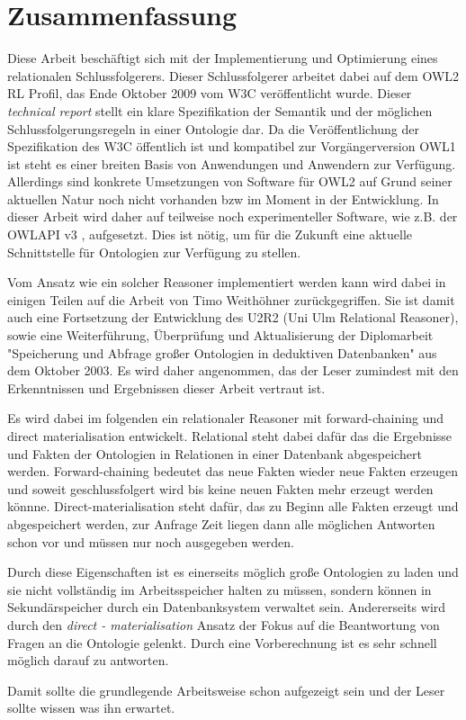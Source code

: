 \section*{Zusammenfassung}
Diese Arbeit beschäftigt sich mit der Implementierung und Optimierung eines relationalen Schlussfolgerers. Dieser Schlussfolgerer arbeitet dabei auf dem OWL2 RL Profil, das Ende Oktober 2009 vom W3C \cite{OWL2Profiles} veröffentlicht wurde. Dieser \emph{technical report} stellt ein klare Spezifikation der Semantik und der möglichen Schlussfolgerungsregeln in einer Ontologie dar. Da die Veröffentlichung der Spezifikation des W3C öffentlich ist und kompatibel zur Vorgängerversion OWL1 \cite{OWL1} ist steht es einer breiten Basis von Anwendungen und Anwendern zur Verfügung. Allerdings sind konkrete Umsetzungen von Software für OWL2 auf Grund seiner aktuellen Natur noch nicht vorhanden bzw im Moment in der Entwicklung. In dieser Arbeit wird daher auf teilweise noch experimenteller Software, wie z.B. der OWLAPI v3 \cite{OWLAPI}, aufgesetzt. Dies ist nötig, um für die Zukunft eine aktuelle Schnittstelle für Ontologien zur Verfügung zu stellen.

Vom Ansatz wie ein solcher Reasoner implementiert werden kann wird dabei in einigen Teilen auf die Arbeit von Timo Weithöhner zurückgegriffen. Sie ist damit auch eine Fortsetzung der Entwicklung des U2R2 (Uni Ulm Relational Reasoner), sowie eine Weiterführung, Überprüfung und Aktualisierung der Diplomarbeit "Speicherung und Abfrage großer Ontologien in deduktiven Datenbanken" aus dem Oktober 2003. Es wird daher angenommen, das der Leser zumindest mit den Erkenntnissen und Ergebnissen dieser Arbeit vertraut ist.

Es wird dabei im folgenden ein relationaler Reasoner mit forward-chaining und direct materialisation entwickelt. Relational steht dabei dafür das die Ergebnisse und Fakten der Ontologien in Relationen in einer Datenbank abgespeichert werden. Forward-chaining bedeutet das neue Fakten wieder neue Fakten erzeugen und soweit geschlussfolgert wird bis keine neuen Fakten mehr erzeugt werden könnne. Direct-materialisation steht dafür, das zu Beginn alle Fakten erzeugt und abgespeichert werden, zur Anfrage Zeit liegen dann alle möglichen Antworten schon vor und müssen nur noch ausgegeben werden.

Durch diese Eigenschaften ist es einerseits möglich große Ontologien zu laden und sie nicht vollständig im Arbeitsspeicher halten zu müssen, sondern können in Sekundärspeicher durch ein Datenbanksystem verwaltet sein. Andererseits wird durch den \emph{direct - materialisation} Ansatz der Fokus auf die Beantwortung von Fragen an die Ontologie gelenkt. Durch eine Vorberechnung ist es sehr schnell möglich darauf zu antworten.

Damit sollte die grundlegende Arbeitsweise schon aufgezeigt sein und der Leser sollte wissen was ihn erwartet.